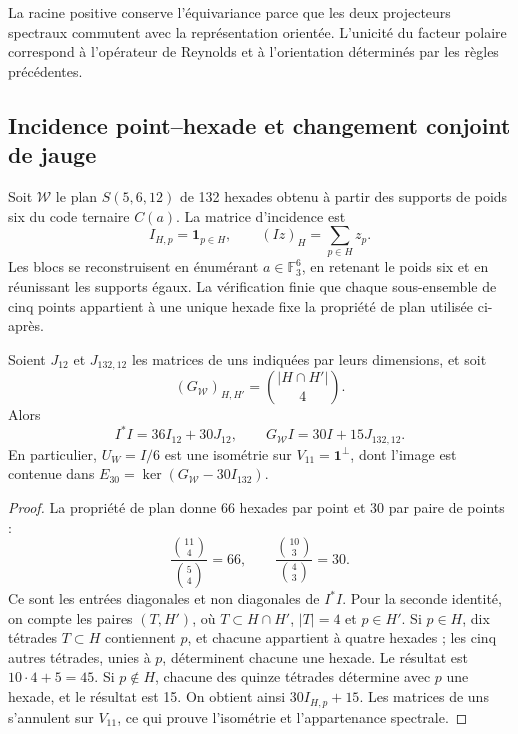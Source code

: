 La racine positive conserve l’équivariance parce que les deux projecteurs
spectraux commutent avec la représentation orientée. L’unicité du
facteur polaire correspond à l’opérateur de Reynolds et à l’orientation
déterminés par les règles précédentes.

\subsection{Incidence point--hexade et changement conjoint de jauge}

Soit \(\mathcal W\) le plan \(S(5,6,12)\) de 132 hexades obtenu
à partir des supports de poids six du code ternaire \(C(a)\). La matrice
d’incidence est
\[
 I_{H,p}=\mathbf1_{p\in H},\qquad
 (Iz)_H=\sum_{p\in H}z_p.
\]
Les blocs se reconstruisent en énumérant \(a\in\mathbb F_3^6\),
en retenant le poids six et en réunissant les supports égaux. La vérification
finie que chaque sous-ensemble de cinq points appartient à une unique
hexade fixe la propriété de plan utilisée ci-après.

\begin{lemma}
\label{lem:ii-witt-incidence-identities}
Soient \(J_{12}\) et \(J_{132,12}\) les matrices de uns indiquées par
leurs dimensions, et soit
\[
 (G_{\mathcal W})_{H,H'}=\binom{|H\cap H'|}{4}.
\]
Alors
\begin{equation}
 I^*I=36I_{12}+30J_{12},\qquad
 G_{\mathcal W}I=30I+15J_{132,12}.
 \label{eq:ii-witt-incidence-identities}
\end{equation}
En particulier, \(U_W=I/6\) est une isométrie sur
\(V_{11}=\mathbf1^\perp\), dont l’image est contenue dans
\(E_{30}=\ker(G_{\mathcal W}-30I_{132})\).
\end{lemma}
\begin{proof}
La propriété de plan donne 66 hexades par point et 30 par paire de points :
\[
 \frac{\binom{11}{4}}{\binom54}=66,
 \qquad \frac{\binom{10}{3}}{\binom43}=30.
\]
Ce sont les entrées diagonales et non diagonales de \(I^*I\).
Pour la seconde identité, on compte les paires \((T,H')\), où
\(T\subset H\cap H'\), \(|T|=4\) et \(p\in H'\).
Si \(p\in H\), dix tétrades \(T\subset H\) contiennent \(p\),
et chacune appartient à quatre hexades ; les cinq autres tétrades,
unies à \(p\), déterminent chacune une hexade. Le résultat est
\(10\cdot4+5=45\). Si \(p\notin H\), chacune des quinze
tétrades détermine avec \(p\) une hexade, et le résultat est 15.
On obtient ainsi \(30I_{H,p}+15\). Les matrices de uns s’annulent sur
\(V_{11}\), ce qui prouve l’isométrie et l’appartenance spectrale.
\end{proof}

